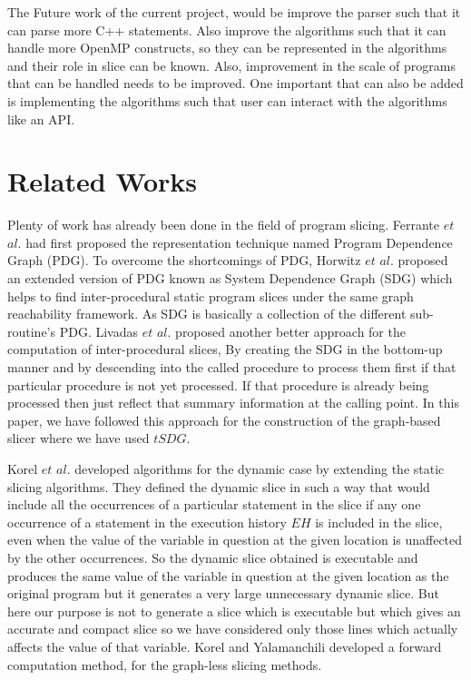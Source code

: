 \documentclass[conference]{IEEEtran}
\begin{document}
\par The Future work of the current project, would be improve the parser such that it can parse more C++ statements. Also improve the algorithms such that it can handle more OpenMP constructs, so they can be represented in the algorithms and their role in slice can  be known. Also, improvement in the scale of programs that can be handled needs to be improved. One important that can also be added is implementing the algorithms such that user can interact with the algorithms like an API. 

\section{Related Works}
\par Plenty of work has already been done in the field of program slicing. 
Ferrante $et$ $al.$\cite{b7}  had first proposed the representation technique named Program Dependence Graph (PDG). To overcome the shortcomings of PDG, Horwitz $et$ $al.$\cite{b8} proposed an extended version of PDG known as System Dependence Graph (SDG) which helps to find inter-procedural static program slices under the same graph reachability framework. As SDG is basically a collection of the different sub-routine's PDG.  Livadas $et$ $al.$\cite{b9} proposed another better approach for the computation of inter-procedural slices, By creating the SDG in the bottom-up manner and by descending into the called procedure to process them first if that particular procedure is not yet processed. If that procedure is already being processed then just reflect that summary information at the calling point. In this paper, we have followed this approach for the construction of the graph-based slicer where we have used $tSDG$. 

\par Korel $et$ $al.$\cite{b10} developed algorithms for the dynamic case by extending the static slicing algorithms. They defined the dynamic slice in such a way that would include all the occurrences of a particular statement in the slice if any one occurrence of a statement in the execution history $EH$ is included in the slice, even when the value of the variable in question at the given location is unaffected by the other occurrences. So the dynamic slice obtained is executable and produces the same value of the variable in question at the given location as the original program but it generates a very large unnecessary dynamic slice. But here our purpose is not to generate a slice which is executable but which gives an accurate and compact slice so we have considered only those lines which actually affects the value of that variable. Korel and Yalamanchili\cite{b11} developed a forward computation method, for the graph-less slicing methods.
\end{document}
